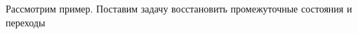 \begin{frame}
\frametitle{\insertsection} 
\framesubtitle{\insertsubsection}
Рассмотрим пример. Поставим задачу восстановить промежуточные состояния и переходы
\inputminted{java}{code/StreamWithoutPeeks.java}
\end{frame}
